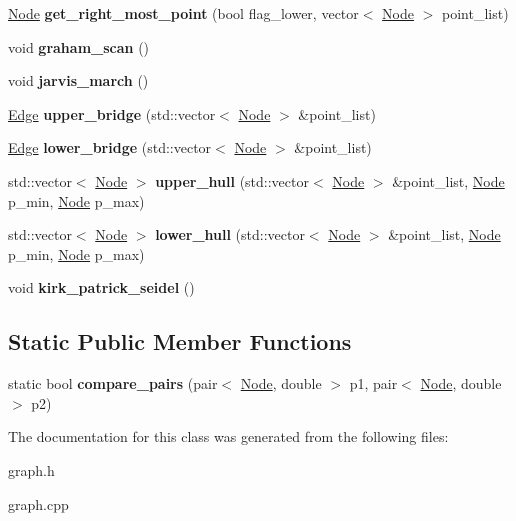 \begin{DoxyCompactItemize}
\mbox{\label{classGraph_ab57f27f64ee47cd5e9a49fdb6de85554}} 
\hyperlink{classNode}{Node} {\bfseries get\+\_\+right\+\_\+most\+\_\+point} (bool flag\+\_\+lower, vector$<$ \hyperlink{classNode}{Node} $>$ point\+\_\+list)
\item 
\mbox{\label{classGraph_a606f345b4d2a90c850733272db8f0936}} 
void {\bfseries graham\+\_\+scan} ()
\item 
\mbox{\label{classGraph_a3645385ecb98f9082c38facede7b1555}} 
void {\bfseries jarvis\+\_\+march} ()
\item 
\mbox{\label{classGraph_a52305b31ad2a6ad8eb200b9413bed9be}} 
\hyperlink{classEdge}{Edge} {\bfseries upper\+\_\+bridge} (std\+::vector$<$ \hyperlink{classNode}{Node} $>$ \&point\+\_\+list)
\item 
\mbox{\label{classGraph_abb8152da6c3a5ded65c88e33d587bf3f}} 
\hyperlink{classEdge}{Edge} {\bfseries lower\+\_\+bridge} (std\+::vector$<$ \hyperlink{classNode}{Node} $>$ \&point\+\_\+list)
\item 
\mbox{\label{classGraph_a8ba642e6f2e4b781b1e069de0a00cd47}} 
std\+::vector$<$ \hyperlink{classNode}{Node} $>$ {\bfseries upper\+\_\+hull} (std\+::vector$<$ \hyperlink{classNode}{Node} $>$ \&point\+\_\+list, \hyperlink{classNode}{Node} p\+\_\+min, \hyperlink{classNode}{Node} p\+\_\+max)
\item 
\mbox{\label{classGraph_a07f61e4cbf5540ef83bb33b19bc44068}} 
std\+::vector$<$ \hyperlink{classNode}{Node} $>$ {\bfseries lower\+\_\+hull} (std\+::vector$<$ \hyperlink{classNode}{Node} $>$ \&point\+\_\+list, \hyperlink{classNode}{Node} p\+\_\+min, \hyperlink{classNode}{Node} p\+\_\+max)
\item 
\mbox{\label{classGraph_a7b1b09417dc55e2b03e0e06feb6d99cc}} 
void {\bfseries kirk\+\_\+patrick\+\_\+seidel} ()
\end{DoxyCompactItemize}
\subsection*{Static Public Member Functions}
\begin{DoxyCompactItemize}
\item 
\mbox{\label{classGraph_ad0d59e9ffd312e3af8bb37f567da3320}} 
static bool {\bfseries compare\+\_\+pairs} (pair$<$ \hyperlink{classNode}{Node}, double $>$ p1, pair$<$ \hyperlink{classNode}{Node}, double $>$ p2)
\end{DoxyCompactItemize}


The documentation for this class was generated from the following files\+:\begin{DoxyCompactItemize}
\item 
graph.\+h\item 
graph.\+cpp\end{DoxyCompactItemize}
